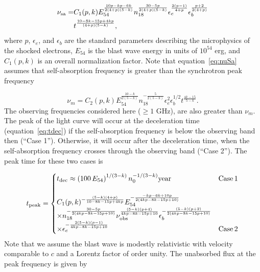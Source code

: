 \documentclass[usenatbib,fleqn]{mnras}
\begin{document}
\begin{align}
  \nu_{\rm sa}=&C_1(p, k) E_{54}^{\frac{10 p-k p -6 k}{2 (4+p) (5-k)}} n_{18}^{\frac{30 - 5 p}{2 (4 + p) (5 - k)}}
  \epsilon_e^{\frac{2 (p-1)}{4+p}} \epsilon_b^{\frac{p+2}{2 (4+p)}}\nonumber\\
  &t^{\frac{10 - 8 k - 15 p + 4 k p}{(4 + p) (5 - k)}}, 
\label{eq:nuSa} 
\end{align}
%
where $p$, $\epsilon_e$, and $\epsilon_b$ are the standard parameters
describing the microphysics of the shocked electrons, $E_{54}$ is the
blast wave energy in units of $10^{54}$ erg, and $C_1(p, k)$ is an
overall normalization factor.  Note that equation~\eqref{eq:nuSa}
assumes that self-absorption frequency is greater than the synchrotron
peak frequency

\begin{equation}
\nu_m=C_2(p, k) E_{54}^{\frac{10-k}{2 (5-k)}} n_{18}^{-\frac{5}{2
    (5-k)}}  \epsilon_e^2  \epsilon_b^{1/2}  t^{\frac{4 k-15}{5-k}}.
\end{equation}
%
The observing frequencies considered here ($\geq 1$ GHz), are also
greater than $\nu_m$. The peak of the light curve will occur at the
deceleration time (equation~\ref{eq:tdec}) if the self-absorption
frequency is below the observing band then (``Case 1''). Otherwise, it
will occur after the deceleration time, when the self-absorption
frequency crosses through the observing band (``Case 2''). The peak
time for these two cases is

\begin{align}
t_{\rm peak}=
\begin{cases}
  t_{\rm dec}\approx \left(100 \, E_{54}\right)^{1/(3-k)}
  n_0^{-1/(3-k)} {\rm year} & {\rm Case\, 1}\\\\
  C_1(p, k)^{-\frac{(5 - k) (4 + p)}{10 - 8 k - 15 p + 4 k
      p}}E_{54}^{-\frac{-k p-6 k+10 p}{2 (4 k p-8 k-15 p+10)}}\\
  \times n_{18}^{-\frac{30-5 p}{2 (4 k p-8 k-15 p+10)}} \nu_{\rm
    obs}^{\frac{(5-k) (p+4)}{4 k p-8 k-15 p+10}}
  \epsilon_b^{-\frac{(5-k) (p+2)}{2 (4 k p-8 k-15 p+10)}}\\
  \times \epsilon_e^{-\frac{2 (5-k) (p-1)}{4 k p-8 k-15 p+10}} & {\rm
    Case\, 2}
\end{cases}
\label{eq:tpeak}
\end{align}
%
Note that we assume the blast wave is modestly relativistic with
velocity comparable to $c$ and a Lorentz factor of order unity. The
unabsorbed flux at the peak frequency is given by
\end{document}

